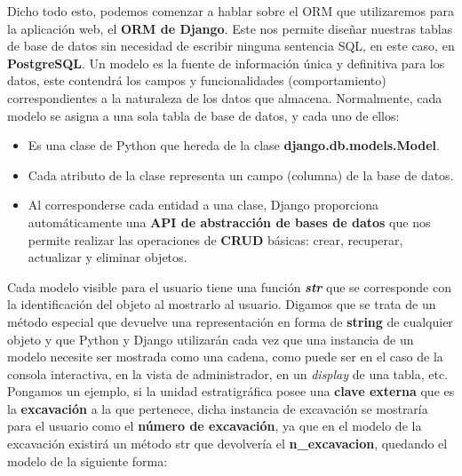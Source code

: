     Dicho todo esto, podemos comenzar a hablar sobre el ORM que utilizaremos para la
    aplicación web, el \textbf{ORM de Django}. Este nos permite diseñar nuestras tablas de 
    base de datos sin necesidad de escribir ninguna sentencia SQL, en este caso, en
    \textbf{PostgreSQL}. Un modelo es la fuente de información única y definitiva para los
    datos, este contendrá los campos y funcionalidades (comportamiento) correspondientes a
    la naturaleza de los datos que almacena. Normalmente, cada modelo se asigna a una sola
    tabla de base de datos, y cada uno de ellos:

        \begin{itemize}
            \item Es una clase de Python que hereda de la clase \textbf{django.db.models.Model}.
            \item Cada atributo de la clase representa un campo (columna) de la base de datos.
            \item Al corresponderse cada entidad a una clase, Django proporciona automáticamente
            una \textbf{API de abstracción de bases de datos} que nos permite realizar las
            operaciones de \textbf{CRUD} básicas: crear, recuperar, actualizar y eliminar
            objetos.
        \end{itemize}

    Cada modelo visible para el usuario tiene una función \textbf{\textit{str}} que se
    corresponde con la identificación del objeto al mostrarlo al usuario. Digamos que se
    trata de un método especial que devuelve una representación en forma de \textbf{string} de
    cualquier objeto y que Python y Django utilizarán cada vez que una instancia de un 
    modelo necesite ser mostrada como una cadena, como puede ser en el caso de la consola
    interactiva, en la vista de administrador, en un \textit{display} de una tabla, etc.\\

    Pongamos un ejemplo, si la unidad estratigráfica posee una \textbf{clave externa} que es
    la \textbf{excavación} a la que pertenece, dicha instancia de excavación se mostraría
    para el usuario como el \textbf{número de excavación}, ya que en el modelo de la
    excavación existirá un método str que devolvería el \textbf{n\_excavacion},
    quedando el modelo de la siguiente forma:

